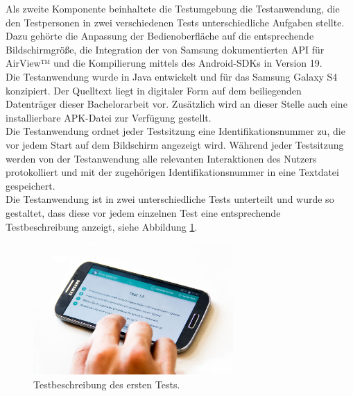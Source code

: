 \documentclass[a4paper,12pt,bibliography=totoc]{scrreprt}%
\begin{document}
Als zweite Komponente beinhaltete die Testumgebung die Testanwendung, die den Testpersonen in zwei verschiedenen Tests unterschiedliche Aufgaben stellte. Dazu gehörte die Anpassung der Bedienoberfläche auf die entsprechende Bildschirmgröße, die Integration der von Samsung dokumentierten API für AirView™ und die Kompilierung mittels des Android-SDKs in Version 19.\\
Die Testanwendung wurde in Java entwickelt und für das Samsung Galaxy S4 konzipiert. Der Quelltext liegt in digitaler Form auf dem beiliegenden Datenträger dieser Bachelorarbeit vor. Zusätzlich wird an dieser Stelle auch eine installierbare APK-Datei zur Verfügung gestellt.\\
Die Testanwendung ordnet jeder Testsitzung eine Identifikationsnummer zu, die vor jedem Start auf dem Bildschirm angezeigt wird. Während jeder Testsitzung werden von der Testanwendung alle relevanten Interaktionen des Nutzers protokolliert und mit der zugehörigen Identifikationsnummer in eine Textdatei gespeichert.\\
Die Testanwendung ist in zwei unterschiedliche Tests unterteilt und wurde so gestaltet, dass diese vor jedem einzelnen Test eine entsprechende Testbeschreibung anzeigt, siehe Abbildung \ref{apparattestbeschreibung}.
\begin{figure}
\centering
\includegraphics[width=0.68\textwidth]{img/apparatus1.jpg}
\caption{Testbeschreibung des ersten Tests.}
\label{apparattestbeschreibung}
\end{figure}
\end{document}
